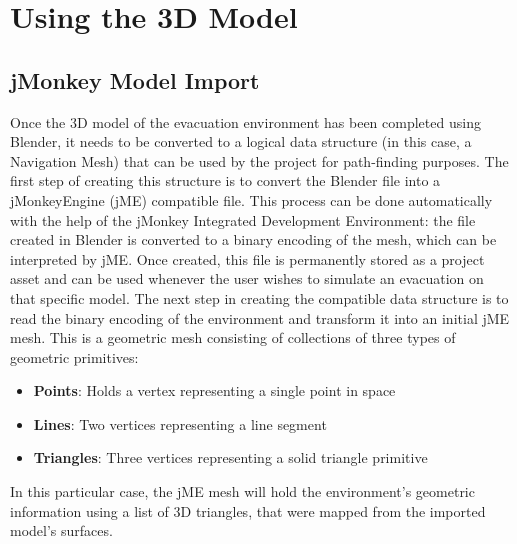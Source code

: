 

%



\section{Using the 3D Model}
\subsection{jMonkey Model Import}
Once the 3D model of the evacuation environment has been completed using Blender, it needs to be converted to a logical data structure (in this case, a Navigation Mesh) that can be used by the project for path-finding purposes. The first step of creating this structure is to convert the Blender file into a jMonkeyEngine (jME) compatible file. This process can be done automatically with the help of the jMonkey Integrated Development Environment: the file created in Blender is converted to a binary encoding of the mesh, which can be interpreted by jME. Once created, this file is permanently stored as a project asset and can be used whenever the user wishes to simulate an evacuation on that specific model.
The next step in creating the compatible data structure is to read the binary encoding of the environment and transform it into an initial jME mesh. This is a geometric mesh consisting of collections of three types of geometric primitives:
\begin{itemize}
  \item\textbf{Points}: Holds a vertex representing a single point in space
  \item\textbf{Lines}: Two vertices representing a line segment
  \item\textbf{Triangles}: Three vertices representing a solid triangle primitive
\end{itemize}
In this particular case, the jME mesh will hold the environment's geometric information using a list of 3D triangles, that were mapped from the imported model's surfaces.

